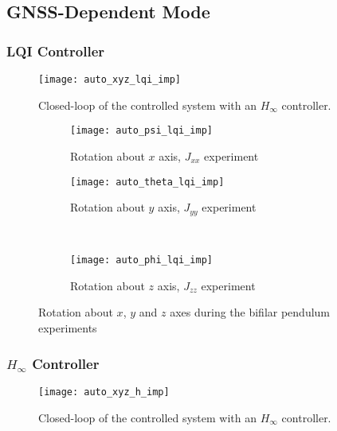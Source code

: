 \subsection{GNSS-Dependent Mode}

\subsubsection{LQI Controller}

\begin{figure}[h]
	\begin{center}
	\texttt{[image: auto\_xyz\_lqi\_imp]}
	\caption{Closed-loop of the controlled system with an $H_{\infty}$ controller.}
	\label{fig:auto_xyz_lqi_imp}
	\end{center}
	\end{figure}
	
\begin{figure}[H]
\begin{subfigure}{.5\linewidth}
\centering
\texttt{[image: auto\_psi\_lqi\_imp]}
\caption{Rotation about $x$ axis, $J_{xx}$ experiment}
\label{fig:auto_psi_lqi_imp}
\end{subfigure}%
\begin{subfigure}{.5\linewidth}
\centering
\texttt{[image: auto\_theta\_lqi\_imp]}
\caption{Rotation about $y$ axis, $J_{yy}$ experiment}
\label{fig:auto_theta_lqi_imp}
\end{subfigure}\\[1ex]
\begin{subfigure}{\linewidth}
\centering
\texttt{[image: auto\_phi\_lqi\_imp]}
\caption{Rotation about $z$ axis, $J_{zz}$ experiment}
\label{fig:auto_psi_lqi_imp}
\end{subfigure}
\caption{Rotation about $x$, $y$ and $z$ axes during the bifilar pendulum experiments}
\label{fig:auto_lqi_imp}
\end{figure}


\subsubsection{$H_\infty$ Controller}

\begin{figure}[h]
	\begin{center}
	\texttt{[image: auto\_xyz\_h\_imp]}
	\caption{Closed-loop of the controlled system with an $H_{\infty}$ controller.}
	\label{fig:auto_xyz_h_imp}
	\end{center}
	\end{figure}
	
